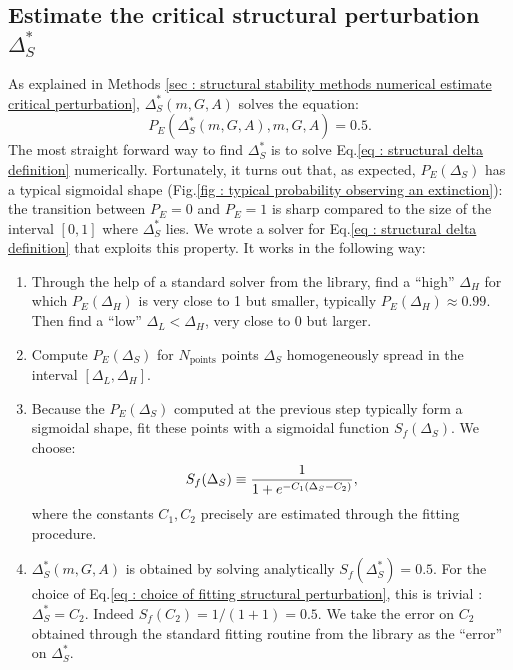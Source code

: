 \documentclass[12pt]{report}
\begin{document}
\subsection{Estimate the critical structural perturbation $\Delta_S^*$}\label{app: results structural stability procedure to estimate critical structural perturbation}
As explained in Methods \ref{sec : structural stability methods numerical estimate critical perturbation}, $\Delta_S^*(m, G, A)$ solves the equation:
\begin{equation}
P_E\left(\Delta_S^*(m, G, A), m, G, A\right) = 0.5. \label{eq : structural delta definition}
\end{equation}
The most straight forward way to find $\Delta_S^*$ is to solve Eq.\eqref{eq : structural delta definition} numerically. Fortunately, it turns out that, as expected, $P_E(\Delta_S)$ has a typical sigmoidal shape (Fig.\ref{fig : typical probability observing an extinction}): the transition between $P_E=0$ and $P_E=1$ is sharp compared to the size of the interval $[0,1]$ where $\Delta_S^*$ lies. We wrote a solver for Eq.\eqref{eq : structural delta definition} that exploits this property. It works in the following way:
\begin{enumerate}
\item Through the help of a standard solver from the  library, find a ``high'' $\Delta_H$ for which $P_E(\Delta_H)$ is very close to 1 but smaller, typically $P_E(\Delta_H) \approx 0.99$. Then find a ``low'' $\Delta_L < \Delta_H$, very close to $0$ but larger.
\item Compute $P_E(\Delta_S)$ for $N_{\text{points}}$ points $\Delta_S$ homogeneously spread in the interval $[\Delta_L, \Delta_H]$.
\item Because the $P_E(\Delta_S)$ computed at the previous step typically form a sigmoidal shape, fit these points with a sigmoidal function $S_f(\Delta_S)$. We choose:
\begin{equation}
S_f(\Delta_S) \equiv \frac{1}{1+e^{-C_1(\Delta_S-C_2)}}, \label{eq : choice of fitting structural perturbation}
\end{equation}
where the constants $C_1, C_2$ precisely are estimated through the fitting procedure.
\item $\Delta_S^*(m, G, A)$ is obtained by solving analytically $S_f(\Delta_S^*)=0.5$. For the choice of Eq.\eqref{eq : choice of fitting structural perturbation}, this is trivial : $\Delta_S^* = C_2$. Indeed $S_f(C_2)=1/(1+1)=0.5$. We take the error on $C_2$ obtained through the standard fitting routine from the  library as the ``error'' on $\Delta_S^*$.
\end{enumerate}
\end{document}
